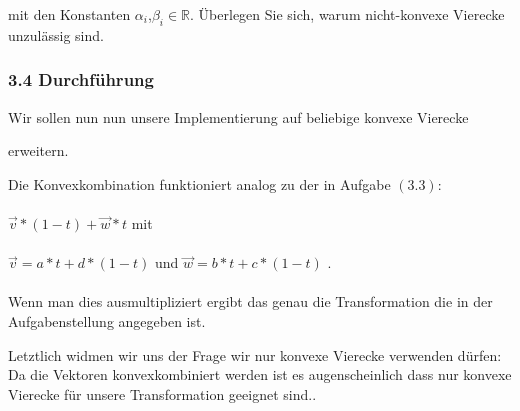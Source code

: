 \documentclass[a4paper,11pt,bibliography=totoc,listof=totoc,headinclude=true,cleardoublepage=empty,oneside]{scrbook}
\begin{document}
			\color{change2}
\begin{flushleft}		mit den Konstanten $\alpha_i$,$\beta_i \in \mathbb{R}$. Überlegen Sie sich, warum nicht-konvexe Vierecke unzulässig sind.\end{flushleft} 
		\vspace*{3mm}
		
		\subsubsection{3.4 Durchführung}
		
		Wir sollen nun nun unsere Implementierung auf beliebige konvexe Vierecke \linebreak
		
		\hspace*{3.5cm}
		
		erweitern.
		
		
		Die Konvexkombination funktioniert analog zu der in Aufgabe $(3.3)$: \\ \\
		
		\hspace{4cm}$\vec{v}*(1-t)+\vec{w}*t$
		\color{change2}
		mit\\ \\
		
	\hspace{2.6cm}	$\vec{v} = a*t+d*(1-t)$ \color{change2}und
		$\vec{w} = b*t+c*(1-t)$ . \\
		\color{change2}
		\hspace{2mm}
		\\Wenn man dies ausmultipliziert ergibt das genau die Transformation die in der Aufgabenstellung angegeben ist. \\
		\begin{flushleft}
	
		Letztlich widmen wir uns der Frage wir nur konvexe Vierecke verwenden dürfen:\\
		Da die Vektoren konvexkombiniert werden ist es augenscheinlich dass nur konvexe Vierecke für unsere Transformation geeignet sind..
		
			\end{flushleft}
\end{document}
